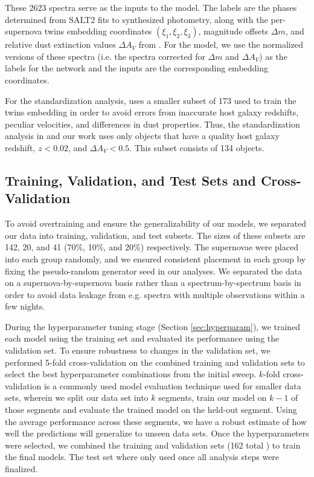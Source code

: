 These 2623 spectra serve as the inputs to the \stoe{} model. The labels are the phases determined from SALT2 fits to synthesized photometry, along with the per-supernova twins embedding coordinates $(\xi_1, \xi_2, \xi_3)$, magnitude offsets $\Delta m$, and relative dust extinction values $\Delta A_V$ from . For the \etos{} model, we use the normalized versions of these spectra (i.e. the spectra corrected for $\Delta m$ and $\Delta A_V$) as the labels for the network and the inputs are the corresponding embedding coordinates.

For the standardization analysis,  uses a smaller subset of 173 \sne used to train the twins embedding in order to avoid errors from inaccurate host galaxy redshifts, peculiar velocities, and differences in dust properties. Thus, the standardization analysis in  and our work uses only objects that have a quality host galaxy redshift, $z<0.02$, and $\Delta A_V < 0.5$. This subset consists of 134 objects.

\subsection{Training, Validation, and Test Sets and Cross-Validation}
\label{sec:nn_twins_data_split}
To avoid overtraining and ensure the generalizability of our models, we separated our data into training, validation, and test subsets. The sizes of these subsets are 142, 20, and 41 (70\%, 10\%, and 20\%) respectively. The supernovae were placed into each group randomly, and we ensured consistent placement in each group by fixing the pseudo-random generator seed in our analyses. We separated the data on a supernova-by-supernova basis rather than a spectrum-by-spectrum basis in order to avoid data leakage from e.g. spectra with multiple observations within a few nights.

During the hyperparameter tuning stage (Section \ref{sec:hyperparam}), we trained each model using the training set and evaluated its performance using the validation set. To ensure robustness to changes in the validation set, we performed 5-fold cross-validation on the combined training and validation sets to select the best hyperparameter combinations from the initial sweep. $k$-fold cross-validation is a commonly used model evaluation technique used for smaller data sets, wherein we split our data set into $k$ segments, train our model on $k-1$ of those segments and evaluate the trained model on the held-out segment. Using the average performance across these segments, we have a robust estimate of how well the predictions will generalize to unseen data sets. Once the hyperparameters were selected, we combined the training and validation sets (162 total \sne) to train the final models. The test set \sne where only used once all analysis steps were finalized.

